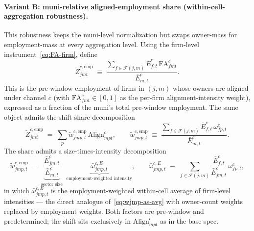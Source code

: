\documentclass{article}
\newcommand{\Align}{\mathrm{Align}}
\newcommand{\FA}{\mathrm{FA}}
\newcommand{\cF}{\mathcal{F}}
\theoremstyle{plain}
\theoremstyle{definition}
\theoremstyle{remark}
\begin{document}
\paragraph{Variant B: muni-relative aligned-employment share (within-cell-aggregation robustness).}
This robustness keeps the muni-level normalization but swaps
owner-mass for employment-mass at every
aggregation level. Using the firm-level
instrument~\eqref{eq:FA-firm}, define
\begin{equation}\label{eq:Z-emp-rel}
  \tilde Z^{c,\mathrm{emp}}_{jmt}
   \;\equiv\;
   \frac{\displaystyle\sum_{f\in\cF(j,m)} \bar E^c_{f,t}\,\FA^{c}_{fmt}}
        {\bar E^c_{m,t}}.
\end{equation}
This is the pre-window employment of firms in $(j,m)$ whose owners are
aligned under channel $c$ (with $\FA^{c}_{fmt}\in[0,1]$ as the
per-firm alignment-intensity weight), expressed as a fraction of the
muni's total pre-window employment. The same object admits the
shift-share decomposition
\begin{equation}\label{eq:Z-emp-rel-ss}
  \tilde Z^{c,\mathrm{emp}}_{jmt}
   \;=\;
   \sum_p \tilde w^{c,\mathrm{emp}}_{jmp,t}\,\Align^{c}_{mpt},
    \qquad
   \tilde w^{c,\mathrm{emp}}_{jmp,t}
   \;\equiv\;
   \frac{\displaystyle\sum_{f\in\cF(j,m)} \bar E^c_{f,t}\,\omega^{c}_{fp,t}}
        {\bar E^c_{m,t}}.
\end{equation}
The share admits a size-times-intensity decomposition
\begin{equation}\label{eq:w-emp-decomp}
  \tilde w^{c,\mathrm{emp}}_{jmp,t}
   \;=\;
    \underbrace{\frac{\bar E^c_{jm,t}}{\bar E^c_{m,t}}}_{\text{sector size}}\;\;
    \underbrace{\bar\omega^{c,E}_{jmp,t}}_{\text{employment-weighted intensity}},
    \qquad
    \bar\omega^{c,E}_{jmp,t}\;\equiv\;
    \sum_{f\in\cF(j,m)} \frac{\bar E^c_{f,t}}{\bar E^c_{jm,t}}\,
    \omega^{c}_{fp,t},
\end{equation}
in which $\bar\omega^{c,E}_{jmp,t}$ is the
employment-weighted within-cell average of firm-level intensities ---
the direct analogue of~\eqref{eq:wjmp-as-avg} with owner-count weights
replaced by employment weights. Both factors are pre-window and
predetermined; the shift sits exclusively in
$\Align^{c}_{mpt}$ as in the base spec.
\end{document}
